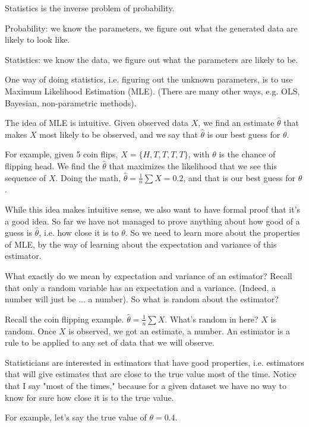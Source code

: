 \documentclass{article}\usepackage[]{graphicx}\usepackage[]{color}
\begin{document}
Statistics is the inverse problem of probability.

Probability: we know the parameters, we figure out what the generated data are likely to look like.

Statistics: we know the data, we figure out what the parameters are likely to be.

One way of doing statistics, i.e. figuring out the unknown parameters, is to use Maximum Likelihood Estimation (MLE). (There are many other ways, e.g. OLS, Bayesian, non-parametric methods).

The idea of MLE is intuitive. Given observed data $X$, we find an estimate $\hat \theta$ that makes $X$ most likely to be observed, and we say that $\hat \theta$ is our best guess for $\theta$.

For example, given 5 coin flips, $X = \{H, T, T, T, T\}$, with $\theta$ is the chance of flipping head. We find the $\hat \theta$ that maximizes the likelihood that we see this sequence of $X$. Doing the math, $\hat \theta = \frac{1}{n} \sum X = 0.2$, and that is our best guess for $\theta$.

While this idea makes intuitive sense, we also want to have formal proof that it's a good idea. So far we have not managed to prove anything about how good of a guess is $\hat \theta$, i.e. how close it is to $\theta$. So we need to learn more about the properties of MLE, by the way of learning about the expectation and variance of this estimator.

What exactly do we mean by expectation and variance of an estimator? Recall that only a random variable has an expectation and a variance. (Indeed, a number will just be ... a number). So what is random about the estimator?

Recall the coin flipping example. $\hat \theta = \frac{1}{n} \sum X$. What's random in here? $X$ is random. Once $X$ is observed, we got an estimate, a number. An estimator is a rule to be applied to any set of data that we will observe.

Statisticians are interested in estimators that have good properties, i.e. estimators that will give estimates that are close to the true value most of the time. Notice that I say "most of the times," because for a given dataset we have no way to know for sure how close it is to the true value.

For example, let's say the true value of $\theta = 0.4$.
\end{document}
